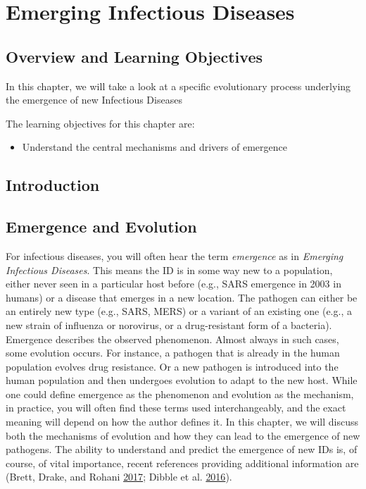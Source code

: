\documentclass[]{book}
\providecommand{\tightlist}{%
  \setlength{\itemsep}{0pt}\setlength{\parskip}{0pt}}
\theoremstyle{definition}
\theoremstyle{definition}
\theoremstyle{definition}
\theoremstyle{remark}
\begin{document}
\chapter{Emerging Infectious
Diseases}\label{emerging-infectious-diseases}

\section{Overview and Learning
Objectives}\label{overview-and-learning-objectives-14}

In this chapter, we will take a look at a specific evolutionary process
underlying the emergence of new Infectious Diseases

The learning objectives for this chapter are:

\begin{itemize}
\tightlist
\item
  Understand the central mechanisms and drivers of emergence
\end{itemize}

\section{Introduction}\label{introduction-13}

\section{Emergence and Evolution}\label{emergence-and-evolution}

For infectious diseases, you will often hear the term \emph{emergence}
as in \emph{Emerging Infectious Diseases}. This means the ID is in some
way new to a population, either never seen in a particular host before
(e.g., SARS emergence in 2003 in humans) or a disease that emerges in a
new location. The pathogen can either be an entirely new type (e.g.,
SARS, MERS) or a variant of an existing one (e.g., a new strain of
influenza or norovirus, or a drug-resistant form of a bacteria).
Emergence describes the observed phenomenon. Almost always in such
cases, some evolution occurs. For instance, a pathogen that is already
in the human population evolves drug resistance. Or a new pathogen is
introduced into the human population and then undergoes evolution to
adapt to the new host. While one could define emergence as the
phenomenon and evolution as the mechanism, in practice, you will often
find these terms used interchangeably, and the exact meaning will depend
on how the author defines it. In this chapter, we will discuss both the
mechanisms of evolution and how they can lead to the emergence of new
pathogens. The ability to understand and predict the emergence of new
IDs is, of course, of vital importance, recent references providing
additional information are (Brett, Drake, and Rohani
\protect\hyperlink{ref-brett17}{2017}; Dibble et al.
\protect\hyperlink{ref-dibble16}{2016}).
\end{document}
